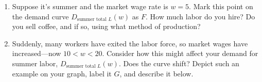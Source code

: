\documentclass[
    letterpaper,paper=portrait,fleqn,
    DIV=16,fontsize=12pt,twoside=semi,
    parskip=full-,
    headings=standardclasses]
{scrartcl}
\begin{document}
\begin{enumerate}
\vfill

\item Suppose it's summer and the market wage rate is $w=5$. Mark this point on the demand curve $D_{\text{summer total }L}(w)$ as $F$. How much labor do you hire? Do you sell coffee, and if so, using what method of production?

\vfill

\item Suddenly, many workers have exited the labor force, so market wages have increased---now $10<w<20$. Consider how this might affect your demand for summer labor, $D_{\text{summer total }L}(w)$. Does the curve shift? Depict such an example on your graph, label it $G$, and describe it below.

\vfill

\end{enumerate}
\end{document}
